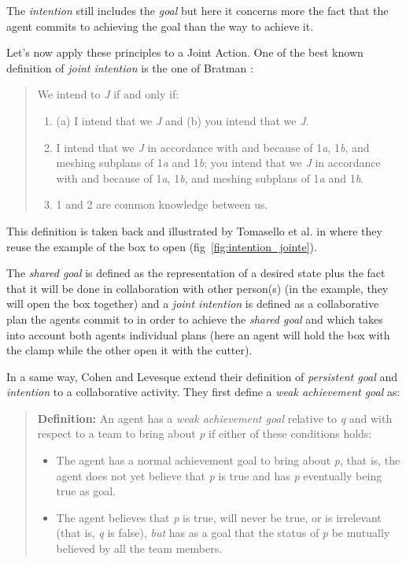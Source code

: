 \documentclass[english,a4paper,11pt,twoside]{StyleThese}
\begin{document}
The \textit{intention} still includes the \textit{goal} but here it concerns more the fact that the agent commits to achieving the goal than the way to achieve it.

\bigskip
Let's now apply these principles to a Joint Action. One of the best known definition of \textit{joint intention} is the one of Bratman \cite{bratman1993shared}:
\begin{quote}
We intend to \textit{J} if and only if:
\begin{enumerate}
\item (a) I intend that we \textit{J} and (b) you intend that we \textit{J}.
\item I intend that we \textit{J} in accordance with and because of 1\textit{a}, 1\textit{b}, and meshing subplans of 1\textit{a} and 1\textit{b}; you intend that we \textit{J} in accordance with and because of 1\textit{a}, 1\textit{b}, and meshing subplans of 1\textit{a} and 1\textit{b}.
\item 1 and 2 are common knowledge between us.
\end{enumerate}
\end{quote}

This definition is taken back and illustrated by Tomasello et al. in \cite{tomasello2005understanding} where they reuse the example of the box to open (fig~\ref{fig:intention_jointe}).


The \textit{shared goal} is defined as the representation of a desired state plus the fact that it will be done in collaboration with other person(s) (in the example, they will open the box together) and a \textit{joint intention} is defined as a collaborative plan the agents commit to in order to achieve the \textit{shared goal} and which takes into account both agents individual plans (here an agent will hold the box with the clamp while the other open it with the cutter).

In a same way, Cohen and Levesque extend their definition of \textit{persistent goal} and \textit{intention} to a collaborative activity. They first define a \textit{weak achievement goal} as:
\begin{quote}
\textbf{Definition: } An agent has a \textit{weak achievement goal} relative to \textit{q} and with respect to a team to bring about \textit{p} if either of these conditions holds:
\begin{itemize}
\item The agent has a normal achievement goal to bring about \textit{p}, that is, the agent does not yet believe that \textit{p} is true and has \textit{p} eventually being true as goal.
\item The agent believes that \textit{p} is true, will never be true, or is irrelevant (that is, \textit{q} is false), \textit{but} has as a goal that the status of \textit{p} be mutually believed by all the team members.
\end{itemize}
\end{quote}
\end{document}
